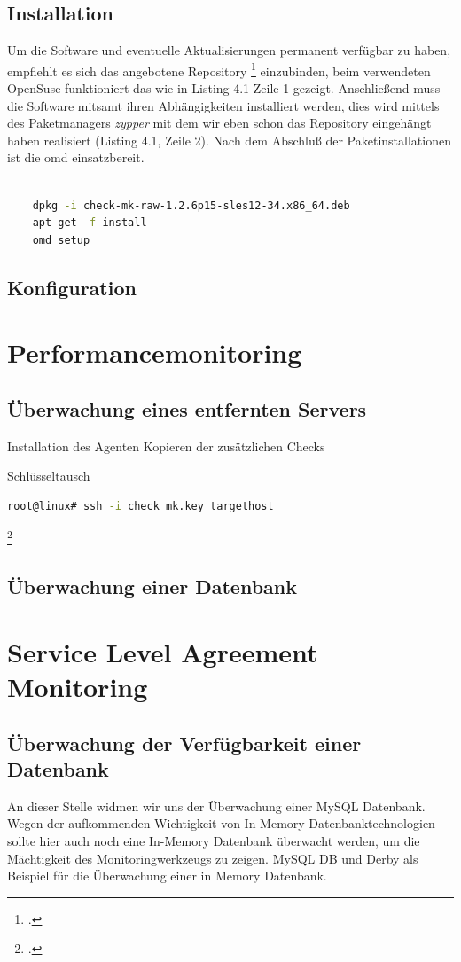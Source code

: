 \documentclass[12pt,a4paper,parskip,listof=totoc,bibliography=totoc]{scrreprt}
\begin{document}
	\subsection{Installation}
	Um die Software und eventuelle Aktualisierungen permanent verfügbar zu haben, empfiehlt es sich das angebotene Repository \footcite{omdrepo} einzubinden, beim verwendeten OpenSuse funktioniert das wie in Listing 4.1 Zeile 1 gezeigt. Anschließend muss die Software mitsamt ihren Abhängigkeiten installiert werden, dies wird mittels des Paketmanagers \textit{zypper} mit dem wir eben schon das Repository eingehängt haben realisiert (Listing 4.1, Zeile 2). Nach dem Abschluß der Paketinstallationen ist die \acrshort{omd} einsatzbereit.
	\begin{lstlisting}[language=bash, caption=Konfiguration eines Repositories und Installation der \acrfull{omd}]	

	dpkg -i check-mk-raw-1.2.6p15-sles12-34.x86_64.deb
	apt-get -f install
	omd setup
	\end{lstlisting}
	\subsection{Konfiguration}
	
	\section{Performancemonitoring}
	\subsection{Überwachung eines entfernten Servers}
	Installation des Agenten
	Kopieren der zusätzlichen Checks
	
	Schlüsseltausch
	\begin{lstlisting}[language=bash]
	root@linux# ssh -i check_mk.key targethost
	\end{lstlisting} \footcite{checkmkCheckBySSH2015}
	\subsection{Überwachung einer Datenbank}
	\section{Service Level Agreement Monitoring}
	\subsection{Überwachung der Verfügbarkeit einer Datenbank}
	An dieser Stelle widmen wir uns der Überwachung einer MySQL Datenbank. 
	Wegen der aufkommenden Wichtigkeit von In-Memory Datenbanktechnologien sollte hier auch noch eine In-Memory Datenbank überwacht werden, um die Mächtigkeit des Monitoringwerkzeugs zu zeigen.
	MySQL DB und Derby als Beispiel für die Überwachung einer in Memory Datenbank.
\end{document}
